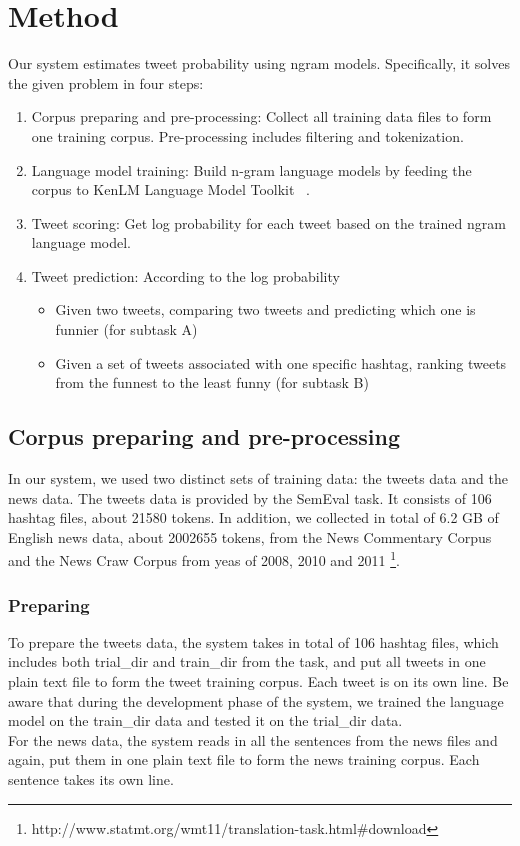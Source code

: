 \documentclass[11pt,a4paper]{article}
\begin{document}
\section{Method}
Our system estimates tweet probability using ngram models. Specifically, it solves the given problem in four steps:
\begin{enumerate}
\item Corpus preparing and pre-processing: Collect all training data files to form one training corpus. Pre-processing includes filtering and tokenization.
\item Language model training: Build n-gram language models by feeding the corpus to KenLM Language Model Toolkit ~\cite{Heafield-estimate}. 
\item Tweet scoring: Get log probability for each tweet based on the trained ngram language model.
\item Tweet prediction: According to the log probability
\begin{itemize}
\item Given two tweets, comparing two tweets and predicting which one is funnier (for subtask A)
\item Given a set of tweets associated with one specific hashtag, ranking tweets from the funnest to the least funny (for subtask B)
\end{itemize}
\end{enumerate}

\subsection{Corpus preparing and pre-processing}
In our system, we used two distinct sets of training data: the tweets data and the news data. The tweets data is provided by the SemEval task. It consists of 106 hashtag files, about 21580 tokens. In addition, we collected in total of 6.2 GB of English news data, about 2002655 tokens, from the News Commentary Corpus and the News Craw Corpus from yeas of 2008, 2010 and 2011 \footnote{http://www.statmt.org/wmt11/translation-task.html\#download}.   
\subsubsection{Preparing}
To prepare the tweets data, the system takes in total of 106 hashtag files, which includes both trial\_dir and train\_dir from the task, and put all tweets in one plain text file to form the tweet training corpus. Each tweet is on its own line. Be aware that during the development phase of the system, we trained the language model on the train\_dir data and tested it on the trial\_dir data. \\
For the news data, the system reads in all the sentences from the news files and again, put them in one plain text file to form the news training corpus. Each sentence takes its own line.
\end{document}
